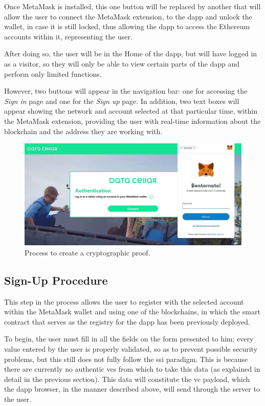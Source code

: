 Once MetaMask is installed, this one button will be replaced by another that will allow the user to connect the MetaMask extension, to the \gls{dapp} and unlock the wallet,
in case it is still locked, thus allowing the \gls{dapp} to access the Ethereum accounts within it, representing the user.

After doing so, the user will be in the Home of the \gls{dapp}, but will have logged in as a visitor, so they will only be able to view certain parts of the \gls{dapp} 
and perform only limited functions.

However, two buttons will appear in the navigation bar: one for accessing the \textit{Sign in} page and one for the \textit{Sign up} page. In addition, two text boxes will appear showing the 
network and account selected at that particular time, within the MetaMask extension, providing the user with real-time information about the blockchain and the address they 
are working with.

\begin{figure}[h]  
  \centering
  \includegraphics[width=1\textwidth]{Images/c6_1.jpg} 
  \caption{Process to create a cryptographic proof.}
\end{figure}

\subsection{Sign-Up Procedure}

This step in the process allows the user to register with the selected account within the MetaMask wallet and using one of the blockchains, in which the smart contract that 
serves as the registry for the \gls{dapp} has been previously deployed.

To begin, the user must fill in all the fields on the form presented to him; every value entered by the user is properly validated, so as to prevent possible security 
problems, but this still does not fully follow the \gls{ssi} paradigm. This is because there are currently no authentic \gls{vc}s from which to take this data (as 
explained in detail in the previous section). This data will constitute the \gls{vc} payload, which the \gls{dapp} browser, in the manner described above, will send through the 
server to the user.

